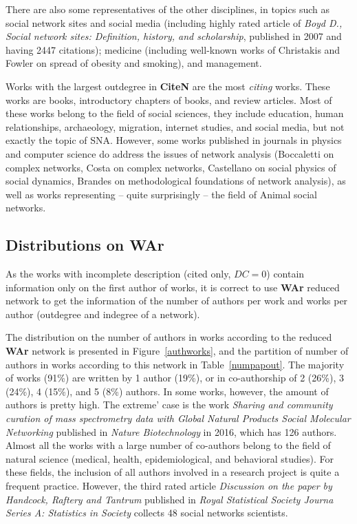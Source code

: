 \documentclass[11pt]{article} %
\begin{document}
There are also some representatives of the other disciplines, in  topics such as social network sites and social media (including highly rated article of \textit{Boyd D., Social network sites: Definition, history, and scholarship}, published in 2007 and having 2447 citations); medicine (including well-known works of Christakis and Fowler on spread of obesity and smoking), and management. \medskip 

Works with the largest outdegree in \textbf{CiteN} are the most \emph{citing} works. These works are books, introductory chapters of books, and review articles. Most of these works belong to the field of social sciences, they include education, human relationships, archaeology, migration, internet studies, and social media, but not exactly the topic of SNA. However, some works published in journals in physics and computer science do address the issues of network analysis (Boccaletti on complex networks, Costa on complex networks, Castellano on social physics of social dynamics, Brandes on methodological foundations of network analysis), as well as works representing -- quite surprisingly -- the field of Animal social networks.

\subsection{Distributions on WAr}

As the works with incomplete description (cited only, $DC=0$) contain information only on the first author of works, it is correct to use \textbf{WAr} reduced network to get the information of the number of authors per work and works per author (outdegree and indegree of a network).\medskip

The distribution on the number of authors in works according to the reduced \textbf{WAr} network is presented in Figure~\ref{authworks}, and the partition of number of authors in works according to this network in Table~\ref{numpapout}. The majority of works (91\%) are written by 1 author (19\%), or in co-authorship of 2 (26\%), 3 (24\%), 4 (15\%), and 5 (8\%) authors. In some works, however, the amount of authors is pretty high. The extreme' case is the work \textit{Sharing and community curation of mass spectrometry data with Global Natural Products Social Molecular Networking} published in \textit{Nature Biotechnology} in 2016, which has 126 authors. Almost all the works with a large number of co-authors belong to the field of natural science (medical, health, epidemiological, and behavioral studies). For these fields, the inclusion of all authors involved in a research project is quite a frequent practice. However, the third rated article \textit{Discussion on the paper by Handcock, Raftery and Tantrum} published in \textit{Royal Statistical Society Journa Series A: Statistics in Society} collects 48 social networks scientists.\medskip
\end{document}
